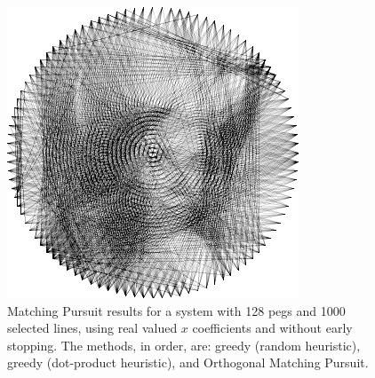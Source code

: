 \begin{figure}[H]
\begin{minipage}{0.2\linewidth}
    \end{minipage}
    \begin{minipage}{0.2\linewidth}
        \centering
        \includegraphics[width=\linewidth]{images/mp/omp.png}
    \end{minipage}
    \caption{Matching Pursuit results for a system with 128 pegs and 1000 selected lines, using real valued \(x\) coefficients and without early stopping. The methods, in order, are: greedy (random heuristic), greedy (dot-product heuristic), and Orthogonal Matching Pursuit.}
    \label{fig:mp_outputs}
\end{figure}

